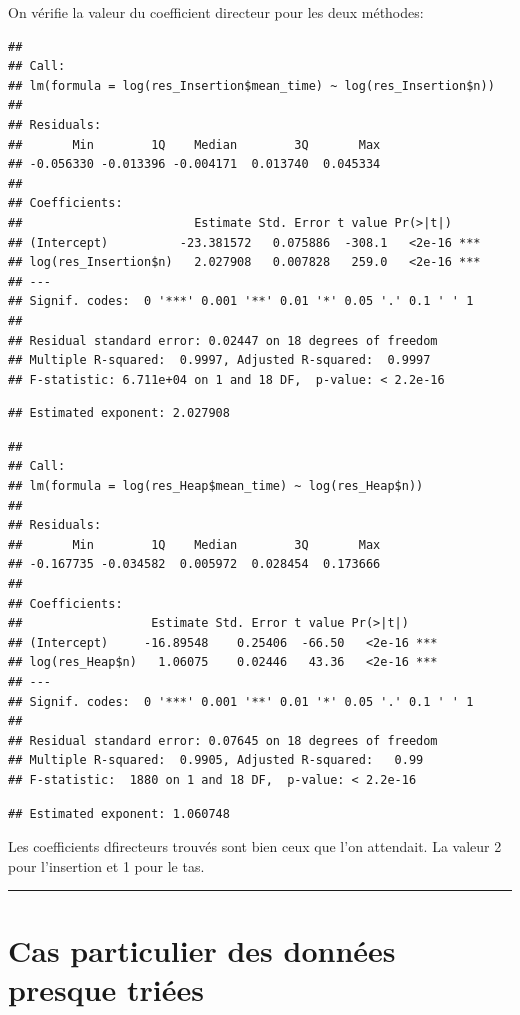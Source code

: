 \documentclass[
]{article}
\begin{document}
On vérifie la valeur du coefficient directeur pour les deux méthodes:

\begin{verbatim}
## 
## Call:
## lm(formula = log(res_Insertion$mean_time) ~ log(res_Insertion$n))
## 
## Residuals:
##       Min        1Q    Median        3Q       Max 
## -0.056330 -0.013396 -0.004171  0.013740  0.045334 
## 
## Coefficients:
##                        Estimate Std. Error t value Pr(>|t|)    
## (Intercept)          -23.381572   0.075886  -308.1   <2e-16 ***
## log(res_Insertion$n)   2.027908   0.007828   259.0   <2e-16 ***
## ---
## Signif. codes:  0 '***' 0.001 '**' 0.01 '*' 0.05 '.' 0.1 ' ' 1
## 
## Residual standard error: 0.02447 on 18 degrees of freedom
## Multiple R-squared:  0.9997, Adjusted R-squared:  0.9997 
## F-statistic: 6.711e+04 on 1 and 18 DF,  p-value: < 2.2e-16
\end{verbatim}

\begin{verbatim}
## Estimated exponent: 2.027908
\end{verbatim}

\begin{verbatim}
## 
## Call:
## lm(formula = log(res_Heap$mean_time) ~ log(res_Heap$n))
## 
## Residuals:
##       Min        1Q    Median        3Q       Max 
## -0.167735 -0.034582  0.005972  0.028454  0.173666 
## 
## Coefficients:
##                  Estimate Std. Error t value Pr(>|t|)    
## (Intercept)     -16.89548    0.25406  -66.50   <2e-16 ***
## log(res_Heap$n)   1.06075    0.02446   43.36   <2e-16 ***
## ---
## Signif. codes:  0 '***' 0.001 '**' 0.01 '*' 0.05 '.' 0.1 ' ' 1
## 
## Residual standard error: 0.07645 on 18 degrees of freedom
## Multiple R-squared:  0.9905, Adjusted R-squared:   0.99 
## F-statistic:  1880 on 1 and 18 DF,  p-value: < 2.2e-16
\end{verbatim}

\begin{verbatim}
## Estimated exponent: 1.060748
\end{verbatim}

Les coefficients dfirecteurs trouvés sont bien ceux que l'on attendait.
La valeur 2 pour l'insertion et 1 pour le tas.

\begin{center}\rule{0.5\linewidth}{0.5pt}\end{center}

\section{Cas particulier des données presque
triées}\label{cas-particulier-des-donnuxe9es-presque-triuxe9es}
\end{document}
